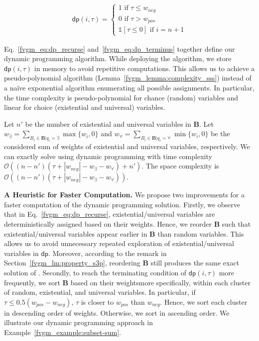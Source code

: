 \begin{align}\label{fvgm_eq:dp_terminus}
 \mathsf{dp}(i, \tau) =
 \begin{cases}
 1\text{ if }\tau \le w_{neg}\\
 0\text{ if } \tau > w_{pos}\\
 \mathds{1}[\tau \le 0] \text{ if } i=n + 1
 \end{cases} 
\end{align}

Eq.~\eqref{fvgm_eq:dp_recurse} and~\eqref{fvgm_eq:dp_terminus} together define our dynamic programming algorithm. While deploying the algorithm, we store $ \mathsf{dp}(i, \tau) $ in memory to avoid repetitive computations.  This allows us to achieve a pseudo-polynomial algorithm (Lemma~\ref{fvgm_lemma:complexity_sss}) instead of a na\"ive exponential algorithm enumerating all possible assignments. In particular, the time complexity is pseudo-polynomial for chance (random) variables and linear for choice (existential and universal) variables.
 
\begin{lemma}\label{fvgm_lemma:complexity_sss}
 	Let $ n' $ be the number of existential and universal variables in $ \mathbf{B} $. Let $ w_{\exists} = \sum_{B_i \in \mathbf{B} | q_i = \exists} \max\{w_i, 0\}$  and $ w_{\forall} = \sum_{B_i \in \mathbf{B} | q_i = \forall} \min\{w_i, 0\}$ be the considered sum of weights of existential and universal variables, respectively. We can exactly solve {\stochastic} using dynamic programming with time complexity $ \mathcal{O}((n - n')(\tau + |w_{neg}| - w_{\exists} - w_{\forall}) + n') $. The space complexity is  $ \mathcal{O}((n - n')(\tau + |w_{neg}| - w_{\exists} - w_{\forall})) $.
\end{lemma}
 


\textbf{A Heuristic for Faster Computation.} 
We propose two improvements for a faster computation of the dynamic programming solution. Firstly, we observe that in Eq.~\eqref{fvgm_eq:dp_recurse}, existential/universal variables are deterministically  assigned based on their weights. Hence, we reorder $ \mathbf{B} $ such that existential/universal variables appear earlier in $ \mathbf{B} $ than random variables. This allows us to avoid unnecessary repeated exploration of existential/universal variables in $ \mathsf{dp} $. Moreover, according to the remark in Section~\ref{fvgm_lm:property_s3p}, reordering $ \mathbf{B} $ still produces the same exact solution of {\stochastic}. Secondly, to reach the terminating condition of $ \mathsf{dp}(i, \tau) $ more frequently, we sort $ \mathbf{B} $ based on their weights\textemdash more specifically, within each cluster of random, existential, and universal variables. In particular, if $ \tau \le 0.5(w_{pos} - w_{neg}) $, $ \tau $ is closer to $ w_{pos} $ than $ w_{neg} $. Hence, we sort each cluster in descending order of weights. Otherwise,  we sort in ascending order. We illustrate our dynamic programming approach in Example~\ref{fvgm_example:subset-sum}.
	
